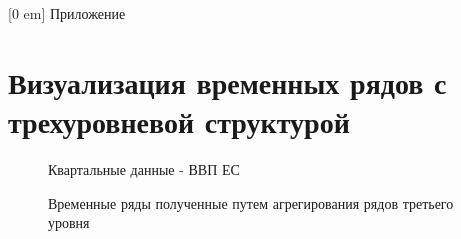 \documentclass[12pt,a4paper, oneside]{extreport}
\begin{document}
              [0 em] %
              {\normalsize}
              {}
              {Приложение }
              {\contentspage}


\chapter[Визуализация временных рядов с трехуровневой структурой]{Визуализация временных рядов с трехуровневой структурой}\label{app-a}
\begin{figure}[H]
	\caption{Временные ряды полученные путем агрегирования рядов третьего уровня }
	\label{otkl_1}

	\centering\footnotesize{Квартальные данные - ВВП ЕС }
		
	\begin{minipage}[H]{0.4\linewidth}
	\end{minipage}
	\begin{minipage}[H]{0.4\linewidth}

\end{minipage}
\end{figure}
\end{document}
